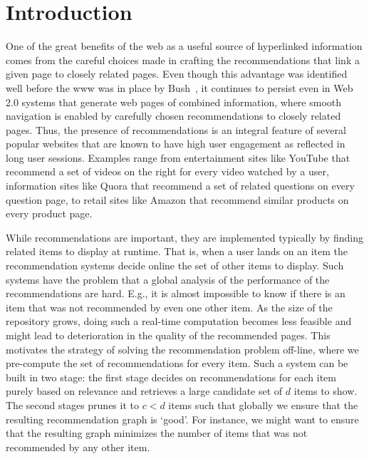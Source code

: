 \begin{abstract}
\iffalse
In this paper, we study the problem of graph recommendations as
variants of bipartite matching problems. We consider the problem
of solving such matching problems in practice at web-scale. To achieve
this we introduce several models to simulate underlying input graph
structures. We then analyze the conditions under which a random sample
of edges using constant memory already suffices to be a
'good' recommendation algorithm as opposed the cases when we may consider
the more classical and involved linear memory polynomial time algorithms.
We also show how to select the number of recommendations per item while
building a website so that there exists a 'perfect' graph recommendation.
\fi

\end{abstract}

\section{Introduction}

One of the great benefits of the web as a useful source of hyperlinked
information comes from the careful choices made in crafting the recommendations
that link a given page to closely related pages. Even though this advantage was
identified well before the www was in place by Bush~\cite{Bush45}, it continues
to persist even in Web 2.0 systems that generate web pages of combined
information, where smooth navigation is enabled by carefully chosen
recommendations to closely related pages. Thus, the presence of recommendations
is an integral feature of several popular websites that are known to have high
user engagement as reflected in long user sessions. Examples range from 
entertainment sites like YouTube that recommend a set of videos on the right
for every video watched by a user, information sites like Quora that recommend
a set of related questions on every question page, to retail sites like Amazon
that recommend similar products on every product page. \vs

While recommendations are important, they are implemented typically by finding
related items to display at runtime. That is, when a user lands on an item the
recommendation systems decide online the set of other items to display. Such
systems have the problem that a global analysis of the performance of the
recommendations are hard. E.g., it is almost impossible to know if there is an
item that was not recommended by even one other item. As the size of the
repository grows, doing such a real-time computation becomes less feasible and
might lead to deterioration in the quality of the recommended pages.  This
motivates the strategy of solving the recommendation problem off-line, where we
pre-compute the set of recommendations for every item. Such a system can be
built in two stage: the first stage decides on recommendations for each item
purely based on relevance and retrieves a large candidate set of $d$ items to
show. The second stages prunes it to $c < d$ items such that globally we ensure
that the resulting recommendation graph is `good'. For instance, we might want
to ensure that the resulting graph minimizes the number of items that was not
recommended by any other item. \vs

